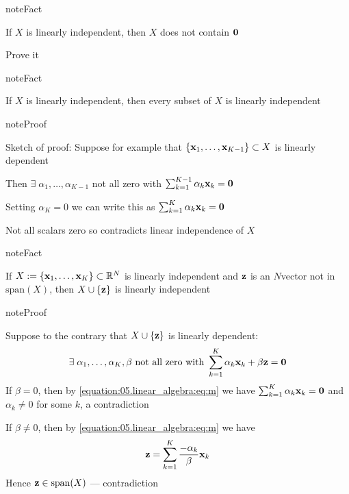 \documentclass[letterpaper,10pt,english]{jupyterBook}
\begin{document}
\begin{sphinxadmonition}{note}{Fact}

\sphinxAtStartPar
If \(X\) is linearly independent, then \(X\) does not contain \({\bf 0}\)
\end{sphinxadmonition}

\sphinxAtStartPar
{} Prove it

\begin{sphinxadmonition}{note}{Fact}

\sphinxAtStartPar
If \(X\) is linearly independent, then every subset of \(X\) is linearly independent
\end{sphinxadmonition}

\begin{sphinxadmonition}{note}{Proof}

\sphinxAtStartPar
Sketch of proof: Suppose for example that \(\{{\bf x}_1,\ldots,
{\bf x}_{K-1}\} \subset X\) is linearly dependent

\sphinxAtStartPar
Then \(\exists \; \alpha_1, \ldots, \alpha_{K-1}\) not all zero with
\(\sum_{k=1}^{K-1} \alpha_k {\bf x}_k = {\bf 0}\)

\sphinxAtStartPar
Setting \(\alpha_K =0\) we can write this as \(\sum_{k=1}^K \alpha_k {\bf x}_k = {\bf 0}\)

\sphinxAtStartPar
Not all scalars zero so contradicts linear independence of \(X\)
\end{sphinxadmonition}

\begin{sphinxadmonition}{note}{Fact}

\sphinxAtStartPar
If \(X:= \{{\bf x}_1,\ldots, {\bf x}_K\} \subset \mathbb{R}^N\) is linearly independent and \({\bf z}\) is an \(N\)\sphinxhyphen{}vector not in \(\mathrm{span}(X)\), then \(X \cup \{ {\bf z} \}\) is linearly independent
\end{sphinxadmonition}

\begin{sphinxadmonition}{note}{Proof}

\sphinxAtStartPar
Suppose to the contrary that \(X \cup \{ {\bf z} \}\) is linearly
dependent:
\begin{equation}\label{equation:05.linear_algebra:eq:m}
\begin{split}
%
\exists \; \alpha_1, \ldots, \alpha_K, \beta
\text{ not all zero with }
\sum_{k=1}^K \alpha_k {\bf x}_k + \beta {\bf z} = {\bf 0}
%
\end{split}
\end{equation}
\sphinxAtStartPar
If \(\beta=0\), then by \eqref{equation:05.linear_algebra:eq:m} we have \(\sum_{k=1}^K \alpha_k {\bf x}_k = {\bf 0}\) and
\(\alpha_k \ne 0\) for some \(k\), a contradiction

\sphinxAtStartPar
If \(\beta \ne0\), then by \eqref{equation:05.linear_algebra:eq:m} we have
\begin{equation*}
\begin{split}
%
{\bf z} = \sum_{k=1}^K \frac{-\alpha_k}{\beta} {\bf x}_k 
%
\end{split}
\end{equation*}
\sphinxAtStartPar
Hence \({\bf z} \in \mathrm{span}(X)\) — contradiction
\end{sphinxadmonition}
\end{document}
